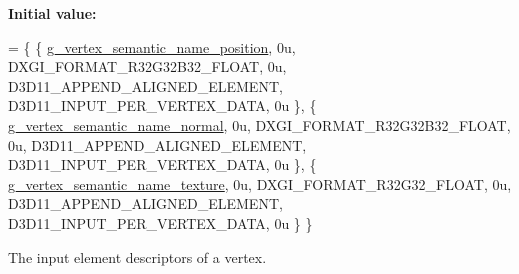 {\bfseries Initial value\+:}
\begin{DoxyCode}
= \{
        \{ \mbox{\hyperlink{namespacemage_1_1rendering_1_1anonymous__namespace_02vertex_8cpp_03_a6e875b92e4de38b14e8dc404df41a5ad}{g\_vertex\_semantic\_name\_position}}, 0u, DXGI\_FORMAT\_R32G32B32\_FLOAT, 
         0u, D3D11\_APPEND\_ALIGNED\_ELEMENT, D3D11\_INPUT\_PER\_VERTEX\_DATA, 0u \},
        \{ \mbox{\hyperlink{namespacemage_1_1rendering_1_1anonymous__namespace_02vertex_8cpp_03_a1b4bf08af207f8c1681ecf617b094ef3}{g\_vertex\_semantic\_name\_normal}},   0u, DXGI\_FORMAT\_R32G32B32\_FLOAT,   
       0u, D3D11\_APPEND\_ALIGNED\_ELEMENT, D3D11\_INPUT\_PER\_VERTEX\_DATA, 0u \},
        \{ \mbox{\hyperlink{namespacemage_1_1rendering_1_1anonymous__namespace_02vertex_8cpp_03_a76de570f9dcc80db1e8e2f0a19536085}{g\_vertex\_semantic\_name\_texture}},  0u, DXGI\_FORMAT\_R32G32\_FLOAT,     
        0u, D3D11\_APPEND\_ALIGNED\_ELEMENT, D3D11\_INPUT\_PER\_VERTEX\_DATA, 0u \}
    \}
\end{DoxyCode}
The input element descriptors of a vertex. 